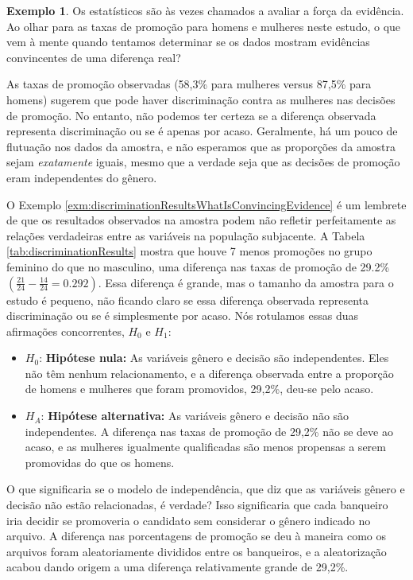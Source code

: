 \documentclass[
]{book}
\theoremstyle{definition}
\theoremstyle{definition}
\newtheorem{example}{Exemplo}[chapter]
\theoremstyle{definition}
\theoremstyle{definition}
\theoremstyle{remark}
\begin{document}
\begin{example}
\protect\hypertarget{exm:discriminationResultsWhatIsConvincingEvidence}{}{\label{exm:discriminationResultsWhatIsConvincingEvidence} }Os estatísticos são às vezes chamados a avaliar a força da evidência. Ao olhar para as taxas de promoção para homens e mulheres neste estudo, o que vem à mente quando tentamos determinar se os dados mostram evidências convincentes de uma diferença real?
\end{example}

As taxas de promoção observadas (58,3\% para mulheres versus 87,5\% para homens) sugerem que pode haver discriminação contra as mulheres nas decisões de promoção. No entanto, não podemos ter certeza se a diferença observada representa discriminação ou se é apenas por acaso. Geralmente, há um pouco de flutuação nos dados da amostra, e não esperamos que as proporções da amostra sejam \emph{exatamente} iguais, mesmo que a verdade seja que as decisões de promoção eram independentes do gênero.

O Exemplo \ref{exm:discriminationResultsWhatIsConvincingEvidence} é um lembrete de que os resultados observados na amostra podem não refletir perfeitamente as relações verdadeiras entre as variáveis na população subjacente. A Tabela \ref{tab:discriminationResults} mostra que houve 7 menos promoções no grupo feminino do que no masculino, uma diferença nas taxas de promoção de 29.2\% \(\left( \frac{21}{24} - \frac{14}{24} = 0.292 \right)\). Essa diferença é grande, mas o tamanho da amostra para o estudo é pequeno, não ficando claro se essa diferença observada representa discriminação ou se é simplesmente por acaso. Nós rotulamos essas duas afirmações concorrentes, \(H_0\) e \(H_1\):

\begin{itemize}
\item
  \(H_0\): \textbf{Hipótese nula:} As variáveis gênero e decisão são independentes. Eles não têm nenhum relacionamento, e a diferença observada entre a proporção de homens e mulheres que foram promovidos, 29,2\%, deu-se pelo acaso.
\item
  \(H_A\): \textbf{Hipótese alternativa:} As variáveis gênero e decisão não são independentes. A diferença nas taxas de promoção de 29,2\% não se deve ao acaso, e as mulheres igualmente qualificadas são menos propensas a serem promovidas do que os homens.
\end{itemize}

O que significaria se o modelo de independência, que diz que as variáveis gênero e decisão não estão relacionadas, é verdade? Isso significaria que cada banqueiro iria decidir se promoveria o candidato sem considerar o gênero indicado no arquivo. A diferença nas porcentagens de promoção se deu à maneira como os arquivos foram aleatoriamente divididos entre os banqueiros, e a aleatorização acabou dando origem a uma diferença relativamente grande de 29,2\%.
\end{document}
